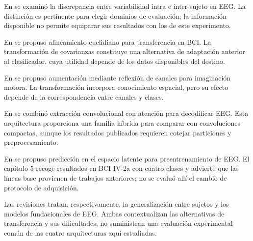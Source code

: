 En \cite{huang2023discrepancy} se examinó la discrepancia entre variabilidad intra e inter-sujeto en EEG. La distinción es pertinente para elegir dominios de evaluación; la información disponible no permite equiparar sus resultados con los de este experimento.

En \cite{he2020ea} se propuso alineamiento euclidiano para transferencia en BCI. La transformación de covarianzas constituye una alternativa de adaptación anterior al clasificador, cuya utilidad depende de los datos disponibles del destino.

En \cite{wang2024channelreflection} se propuso aumentación mediante reflexión de canales para imaginación motora. La transformación incorpora conocimiento espacial, pero su efecto depende de la correspondencia entre canales y clases.

En \cite{song2023conformer} se combinó extracción convolucional con atención para decodificar EEG. Esta arquitectura proporciona una familia híbrida para comparar con convoluciones compactas, aunque los resultados publicados requieren cotejar particiones y preprocesamiento.

En \cite{li2026eegjepa} se propuso predicción en el espacio latente para preentrenamiento de EEG. El capítulo 5 recoge resultados en BCI IV-2a con cuatro clases y advierte que las líneas base provienen de trabajos anteriores; no se evaluó allí el cambio de protocolo de adquisición.

Las revisiones \cite{li2026survey,kuruppu2026fmreview} tratan, respectivamente, la generalización entre sujetos y los modelos fundacionales de EEG. Ambas contextualizan las alternativas de transferencia y sus dificultades; no suministran una evaluación experimental común de las cuatro arquitecturas aquí estudiadas.

